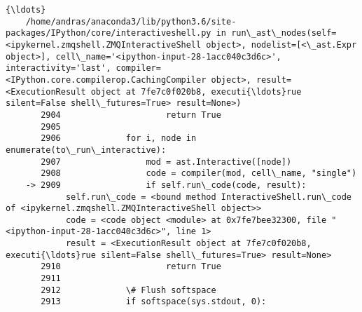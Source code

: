 \documentclass[11pt]{article}
\begin{document}
\begin{Verbatim}[commandchars=\\\{\}]
    {\ldots}
    /home/andras/anaconda3/lib/python3.6/site-packages/IPython/core/interactiveshell.py in run\_ast\_nodes(self=<ipykernel.zmqshell.ZMQInteractiveShell object>, nodelist=[<\_ast.Expr object>], cell\_name='<ipython-input-28-1acc040c3d6c>', interactivity='last', compiler=<IPython.core.compilerop.CachingCompiler object>, result=<ExecutionResult object at 7fe7c0f020b8, executi{\ldots}rue silent=False shell\_futures=True> result=None>)
       2904                     return True
       2905 
       2906             for i, node in enumerate(to\_run\_interactive):
       2907                 mod = ast.Interactive([node])
       2908                 code = compiler(mod, cell\_name, "single")
    -> 2909                 if self.run\_code(code, result):
            self.run\_code = <bound method InteractiveShell.run\_code of <ipykernel.zmqshell.ZMQInteractiveShell object>>
            code = <code object <module> at 0x7fe7bee32300, file "<ipython-input-28-1acc040c3d6c>", line 1>
            result = <ExecutionResult object at 7fe7c0f020b8, executi{\ldots}rue silent=False shell\_futures=True> result=None>
       2910                     return True
       2911 
       2912             \# Flush softspace
       2913             if softspace(sys.stdout, 0):
    

\end{Verbatim}
\end{document}
